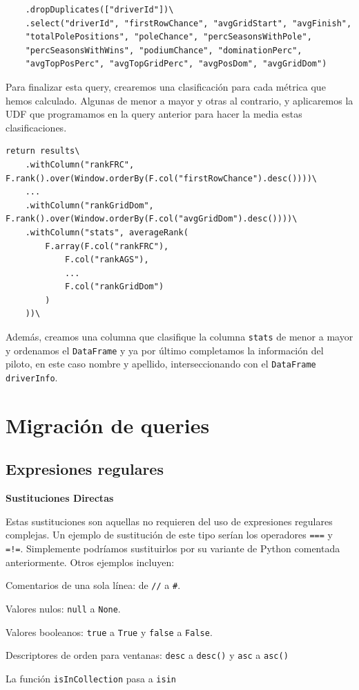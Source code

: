 \documentclass[12pt,twoside,titlepage]{report}
\begin{document}
\begin{lstlisting}
	.dropDuplicates(["driverId"])\
	.select("driverId", "firstRowChance", "avgGridStart", "avgFinish", 
	"totalPolePositions", "poleChance", "percSeasonsWithPole", 
	"percSeasonsWithWins", "podiumChance", "dominationPerc", 
	"avgTopPosPerc", "avgTopGridPerc", "avgPosDom", "avgGridDom")
\end{lstlisting}

Para finalizar esta query, crearemos una clasificación para cada métrica que hemos calculado. Algunas de menor a mayor y otras al contrario, y aplicaremos la UDF que programamos en la query anterior para hacer la media estas clasificaciones.

\begin{lstlisting}
return results\
	.withColumn("rankFRC", F.rank().over(Window.orderBy(F.col("firstRowChance").desc())))\
	...
	.withColumn("rankGridDom", F.rank().over(Window.orderBy(F.col("avgGridDom").desc())))\
	.withColumn("stats", averageRank(
		F.array(F.col("rankFRC"),
			F.col("rankAGS"),
			...
			F.col("rankGridDom")
		)
	))\
\end{lstlisting}

Además, creamos una columna que clasifique la columna \texttt{stats} de menor a mayor y ordenamos el \texttt{DataFrame} y ya por último completamos la información del piloto, en este caso nombre y apellido, interseccionando con el \texttt{DataFrame} \texttt{driverInfo}.

\chapter{Migración de queries}

\section{Expresiones regulares}
\label{sec:regexplained}

\textbf{Sustituciones Directas}

Estas sustituciones son aquellas no requieren del uso de expresiones regulares complejas. Un ejemplo de sustitución de este tipo serían los operadores \texttt{===} y \texttt{=!=}. Simplemente podríamos sustituirlos por su variante de Python comentada anteriormente. Otros ejemplos incluyen:

\begin{compactitem}
	\item Comentarios de una sola línea: de \texttt{//} a \texttt{\#}.
	\item Valores nulos: \texttt{null} a \texttt{None}.
	\item Valores booleanos: \texttt{true} a \texttt{True} y \texttt{false} a \texttt{False}.
	\item Descriptores de orden para ventanas: \texttt{desc} a \texttt{desc()} y \texttt{asc} a \texttt{asc()}
	\item La función \texttt{isInCollection} pasa a \texttt{isin}
\end{compactitem}
\end{document}
